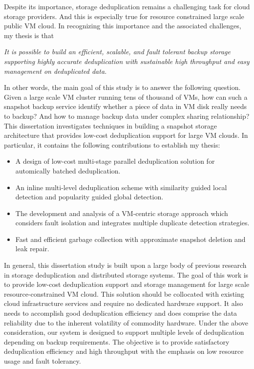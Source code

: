 Despite its importance, storage deduplication remains a challenging task for cloud storage providers. 
And this is especially true for resource constrained large scale public VM cloud. 
In recognizing this importance and
the associated challenges,  my thesis is that

\textit{It  is  possible  to  build  an efficient, scalable, and fault tolerant backup storage
supporting highly accurate deduplication with sustainable high throughput
and easy management on deduplicated data.}

In  other  words,  the  main  goal  of this  study  is  to  answer  the  following 
question.  Given a large scale VM cluster running tens of thousand of VMs, 
how can such a snapshot backup service identify whether a piece of data in VM disk
really needs to backup? And how to manage backup data under complex sharing relationship?
This dissertation investigates 
techniques  in  building  a snapshot storage architecture that provides 
low-cost deduplication support for large VM clouds.  In particular,  it 
contains the following contributions to establish my thesis:

\begin{itemize}
\item A design of low-cost multi-stage parallel deduplication solution for automically batched deduplication.
\item An inline multi-level deduplication scheme with similarity guided local detection and popularity guided global detection.
\item The development and analysis of a VM-centric storage approach which considers fault isolation and integrates multiple duplicate detection strategies.
\item Fast and efficient garbage collection with approximate snapshot deletion and leak repair.
\end{itemize}

In general, this  dissertation  study  is  built  upon  a  large  body  of previous  research 
in storage deduplication and distributed storage systems.  The goal 
of this work is to provide low-cost deduplication support and storage management for 
large scale resource-constrained VM cloud. This solution should be collocated with existing
cloud infrastructure services and require no dedicated hardware support. It also needs to
accomplish good deduplication efficiency and does comprise the data reliability due to the
inherent volatility of commodity hardware.
Under the  above consideration, our system is designed to support multiple levels of deduplication
depending on backup requirements. The objective is to provide satisfactory deduplication efficiency
and high throughput with the emphasis on low resource usage and fault tolerancy.

